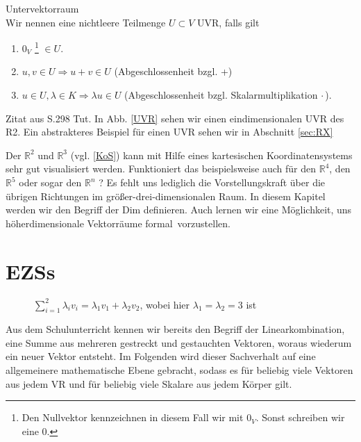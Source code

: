 \theoremstyle{definition}
\begin{definition}{Untervektorraum}
\label{UVR}
\\ \glqq Wir nennen eine nichtleere Teilmenge $U \subset V$ \acl{UVR}, falls gilt 
\begin{enumerate}
\item  $0_V$ \footnote{\label{foot:8}Den Nullvektor kennzeichnen in diesem Fall wir mit $0_V$. Sonst schreiben wir eine $0$.} $\in U$.
\item $u,v \in U \Rightarrow u + v \in U$ (Abgeschlossenheit bzgl. +)
\item $u \in U \text{,} \, \lambda \in K \Rightarrow \lambda u \in U$ (Abgeschlossenheit bzgl. Skalarmultiplikation $\cdot$\,).\grqq
\end{enumerate} 
\end{definition}
Zitat aus S.298 Tut.
In Abb. \ref{UVR} sehen wir einen eindimensionalen \acl{UVR} des \acl{R2}. Ein abstrakteres Beispiel für einen \acl{UVR} sehen wir in Abschnitt \ref{sec:RX}

Der $\mathbb{R}^2$ und $\mathbb{R}^3$ (vgl. \ref{KoS}) kann mit Hilfe eines kartesischen Koordinatensystems sehr gut visualisiert werden. Funktioniert das beispielsweise auch für den $\mathbb{R}^4$, den $\mathbb{R}^5$ oder sogar den $\mathbb{R}^n$ ? Es fehlt uns lediglich die Vorstellungskraft über die übrigen Richtungen im größer-drei-dimensionalen Raum. In diesem Kapitel werden wir den Begriff der \acl{Dim} definieren.
Auch lernen wir eine Möglichkeit, uns höherdimensionale Vektorräume \glqq formal\grqq \, vorzustellen.

\section{\aclp{EZS}}
\label{Erz}

\begin{figure}[h]
\centering
\def\svgwidth{150pt}

\caption{\(\sum \limits_{i=1}^{2} \lambda_i v_i = \lambda_1 v_1 + \lambda_2 v_2\), wobei hier $\lambda_1=\lambda_2=3$ ist}
\label{linkombgrafik}
\end{figure}

Aus dem Schulunterricht kennen wir bereits den Begriff der Linearkombination, eine Summe aus mehreren gestreckt und gestauchten Vektoren, woraus wiederum ein neuer Vektor entsteht. Im Folgenden wird dieser Sachverhalt auf eine allgemeinere mathematische Ebene gebracht, sodass es für beliebig viele Vektoren aus jedem \acl{VR} und für beliebig viele Skalare aus jedem Körper gilt.

